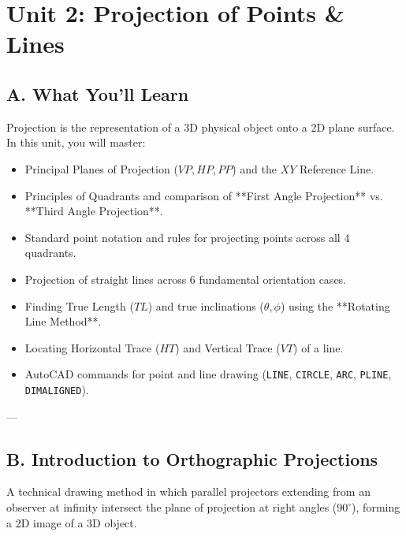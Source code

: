 \chapter{Unit 2: Projection of Points \& Lines}

\section{A. What You'll Learn}
Projection is the representation of a 3D physical object onto a 2D plane surface. In this unit, you will master:
\begin{itemize}
    \item Principal Planes of Projection ($VP, HP, PP$) and the $XY$ Reference Line.
    \item Principles of Quadrants and comparison of **First Angle Projection** vs. **Third Angle Projection**.
    \item Standard point notation and rules for projecting points across all 4 quadrants.
    \item Projection of straight lines across 6 fundamental orientation cases.
    \item Finding True Length ($TL$) and true inclinations ($\theta, \phi$) using the **Rotating Line Method**.
    \item Locating Horizontal Trace ($HT$) and Vertical Trace ($VT$) of a line.
    \item AutoCAD commands for point and line drawing (\texttt{LINE}, \texttt{CIRCLE}, \texttt{ARC}, \texttt{PLINE}, \texttt{DIMALIGNED}).
\end{itemize}

---

\section{B. Introduction to Orthographic Projections}

\begin{definition}
A technical drawing method in which parallel projectors extending from an observer at infinity intersect the plane of projection at right angles ($90^\circ$), forming a 2D image of a 3D object.
\end{definition}

